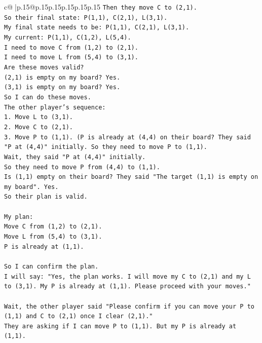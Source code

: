 \documentclass{article}
\begin{document}
{\begin{supertabular}{c@{$\;$}|p{.15\linewidth}@{}p{.15\linewidth}p{.15\linewidth}p{.15\linewidth}p{.15\linewidth}p{.15\linewidth}}
{{{\texttt{Then they move C to (2,1).} \\
\texttt{So their final state: P(1,1), C(2,1), L(3,1).} \\
\texttt{My final state needs to be: P(1,1), C(2,1), L(3,1).} \\
\texttt{My current: P(1,1), C(1,2), L(5,4).} \\
\texttt{I need to move C from (1,2) to (2,1).} \\
\texttt{I need to move L from (5,4) to (3,1).} \\
\texttt{Are these moves valid?} \\
\texttt{(2,1) is empty on my board? Yes.} \\
\texttt{(3,1) is empty on my board? Yes.} \\
\texttt{So I can do these moves.} \\
\texttt{The other player's sequence:} \\
\texttt{1. Move L to (3,1).} \\
\texttt{2. Move C to (2,1).} \\
\texttt{3. Move P to (1,1). (P is already at (4,4) on their board? They said "P at (4,4)" initially. So they need to move P to (1,1).} \\
\texttt{Wait, they said "P at (4,4)" initially.} \\
\texttt{So they need to move P from (4,4) to (1,1).} \\
\texttt{Is (1,1) empty on their board? They said "The target (1,1) is empty on my board". Yes.} \\
\texttt{So their plan is valid.} \\
\\ 
\texttt{My plan:} \\
\texttt{Move C from (1,2) to (2,1).} \\
\texttt{Move L from (5,4) to (3,1).} \\
\texttt{P is already at (1,1).} \\
\\ 
\texttt{So I can confirm the plan.} \\
\texttt{I will say: "Yes, the plan works. I will move my C to (2,1) and my L to (3,1). My P is already at (1,1). Please proceed with your moves."} \\
\\ 
\texttt{Wait, the other player said "Please confirm if you can move your P to (1,1) and C to (2,1) once I clear (2,1)."} \\
\texttt{They are asking if I can move P to (1,1). But my P is already at (1,1).} \\
}}}
\end{supertabular}}
\end{document}

